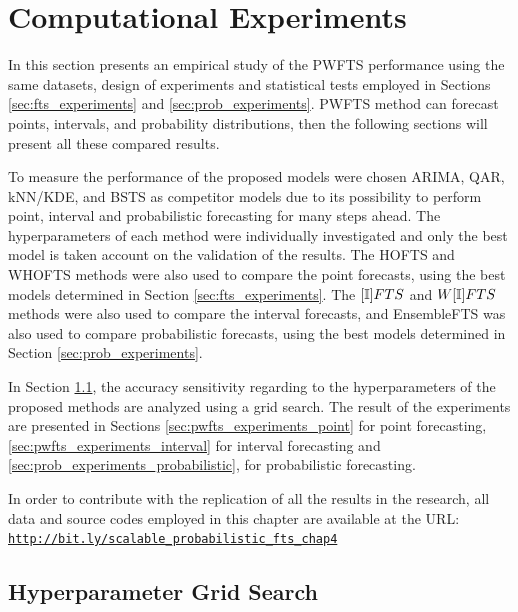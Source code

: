 \section{Computational Experiments}
\label{sec:pwfts_experiments}

In this section presents an empirical study of the PWFTS performance using the same datasets, design of experiments and statistical tests employed in Sections \ref{sec:fts_experiments} and \ref{sec:prob_experiments}. PWFTS method can forecast points, intervals, and probability distributions, then the following sections will present all these compared results.

To measure the performance of the proposed models were chosen ARIMA, QAR, kNN/KDE, and BSTS as competitor models due to its possibility to perform point, interval and probabilistic forecasting for many steps ahead. The hyperparameters of each method were individually investigated and only the best model is taken account on the validation of the results. The HOFTS and WHOFTS methods were also used to compare the point forecasts, using the best models determined in Section \ref{sec:fts_experiments}. The $[\mathbb{I}]FTS$ and $W[\mathbb{I}]FTS$ methods were also used to compare the interval forecasts, and EnsembleFTS was also used to compare probabilistic forecasts, using the best models determined in Section \ref{sec:prob_experiments}.

In Section \ref{sec:pwfts_hyperparameters}, the accuracy sensitivity regarding to the hyperparameters of the proposed methods are analyzed using a grid search. The result of the experiments are presented in Sections \ref{sec:pwfts_experiments_point} for point forecasting, \ref{sec:pwfts_experiments_interval} for interval forecasting  and  \ref{sec:prob_experiments_probabilistic}, for probabilistic forecasting.

In order to contribute with the replication of all the results in the research, all data and source codes employed in this chapter are available at the URL:
\texttt{\url{http://bit.ly/scalable_probabilistic_fts_chap4}}

\subsection{Hyperparameter Grid Search}
\label{sec:pwfts_hyperparameters}

